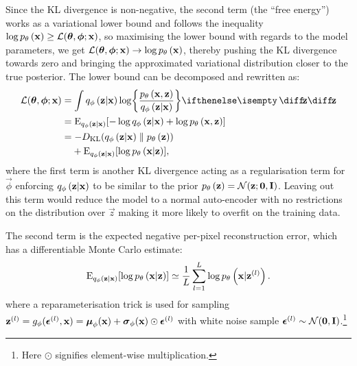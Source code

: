 Since the KL divergence is non-negative, the second term (the ``free energy'') works as a variational lower bound and follows the inequality $\log p_{\theta}\left(\bm{\mathrm{x}}\right) \ge \mathcal{L}(\bm{\mathrm{\theta}},\bm{\mathrm{\phi}};\bm{\mathrm{x}})$, so maximising the lower bound with regards to the model parameters, we get $\mathcal{L}(\bm{\mathrm{\theta}},\bm{\mathrm{\phi}};\bm{\mathrm{x}})\rightarrow \log p_{\theta}\left(\bm{\mathrm{x}}\right)$, thereby pushing the KL divergence towards zero and bringing the approximated variational distribution closer to the true posterior.
The lower bound can be decomposed and rewritten as:
\begin{gather}
	\begin{split}
		\mathcal{L}\parens{\vec{\theta},\vec{\phi};\vec{x}} 
		& = \int \enc{\vec{z}|\vec{x}} \log \curlies*{ \frac{\dec{\vec{x},\vec{z}}}{\enc{\vec{z}|\vec{x}} } } \D{\vec{z}} \\
		& = \E_{\enc{\vec{z}|\vec{x}}} \brackets{- \log \enc{\vec{z}|\vec{x}} + \log \dec{\vec{x},\vec{z}} } 
		\\
		& = -D\idx{KL}\parens{ \enc{\vec{z}|\vec{x}} \parallel \dec{\vec{z}} }
        \\ & \hphantom{{}=}
        + \E_{\enc{\vec{z}|\vec{x}}} \brackets{\log \dec{\vec{x}|\vec{z}} } ,	
	\end{split}
\end{gather}
where the first term is another KL divergence acting as a regularisation term for $\vec{\phi}$ enforcing $q_{\phi}\left(\bm{\mathrm{z}}|\bm{\mathrm{x}}\right)$ to be similar to the prior $p_{\theta}\left(\bm{\mathrm{z}}\right) = \mathcal{N}(\bm{\mathrm{z}}; \bm{\mathrm{0}},\bm{\mathrm{I}})$. Leaving out this term would reduce the model to a normal auto-encoder with no restrictions on the distribution over $\vec{z}$ making it more likely to overfit on the training data.

The second term is the expected negative per-pixel reconstruction error, which has a differentiable Monte Carlo estimate:
\begin{equation}
	\operatorname{E}_{q_{\phi}\left(\bm{\mathrm{z}}|\bm{\mathrm{x}}\right)} [\log p_{\theta}\left(\bm{\mathrm{x}}|\bm{\mathrm{z}}\right) ] \simeq \frac{1}{L}\sum^L_{l=1} \log p_{\theta}\left(\bm{\mathrm{x}}|\bm{\mathrm{z}}^{(l)}\right).
\end{equation}
where a reparameterisation trick is used for sampling $\bm{\mathrm{z}}^{(l)}= g_\phi (\bm{\mathrm{\epsilon}}^{(l)}, \bm{\mathrm{x}})= \bm{\mathrm{\mu}}_\phi(\bm{\mathrm{x}}) + \bm{\mathrm{\sigma}}_\phi(\bm{\mathrm{x}}) \odot \bm{\mathrm{\epsilon}}^{(l)}$ with white noise sample $\bm{\mathrm{\epsilon}}^{(l)} \sim \mathcal{N}(\bm{\mathrm{0}},\bm{\mathrm{I}})$.\footnote{Here $\odot$ signifies element-wise
multiplication.}

